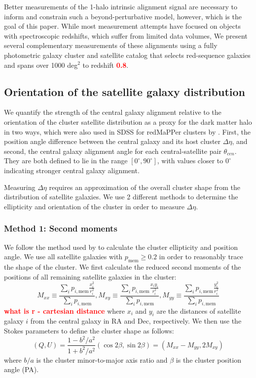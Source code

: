 \documentclass[fleqn,usenatbib]{mnras}
\newcommand{\verify}[1]{\textcolor{red}{\textbf{{#1}}}}
\newcommand{\degree}{^{\circ}}
\begin{document}
Better measurements of the 1-halo intrinsic alignment signal are necessary to inform and constrain such a beyond-perturbative model, however, which is the goal of this paper. While most measurement attempts have focused on objects with spectroscopic redshifts, which suffer from limited data volumes, We present several complementary measurements of these alignments using a fully photometric galaxy cluster and satellite catalog that selects red-sequence galaxies and spans over 1000 deg$^2$ to redshift \verify{0.8}.

\subsection{Orientation of the satellite galaxy distribution}\label{pamethod}

We quantify the strength of the central galaxy alignment relative to the orientation of the cluster satellite distribution as a proxy for the dark matter halo in two ways, which were also used in SDSS for redMaPPer clusters by \cite{Huang_2016}. First, the position angle difference between the central galaxy and its host cluster $\Delta \eta$, and second, the central galaxy alignment angle for each central-satellite pair $\theta _{cen}$. They are both defined to lie in the range $[0 \degree , 90 \degree]$, with values closer to $0 \degree$ indicating stronger central galaxy alignment.

Measuring $\Delta \eta$ requires an approximation of the overall cluster shape from the distribution of satellite galaxies. We use 2 different methods to determine the ellipticity and orientation of the cluster in order to measure $\Delta \eta$.

\subsubsection{Method 1: Second moments}

We follow the method used by \citet{Huang_2016} to calculate the cluster ellipticity and position angle. We use all satellite galaxies with $p_{\mathrm{mem}} \geq 0.2$ in order to reasonably trace the shape of the cluster. We first calculate the reduced second moments of the positions of all remaining satellite galaxies in the cluster:
\begin{equation}
    M_{xx} \equiv \frac{\sum_i p_{i,\mathrm{mem}} \frac{x_i^2}{r_i^2}}{\sum_i p_{i,\mathrm{mem}}}, M_{xy} \equiv \frac{\sum_i p_{i,\mathrm{mem}} \frac{x_i y_i}{r_i^2}}{\sum_i p_{i,\mathrm{mem}}}, M_{yy} \equiv \frac{\sum_i p_{i,\mathrm{mem}} \frac{y_i^2}{r_i^2}}{\sum_i p_{i,\mathrm{mem}}}
\end{equation}
\verify{what is r - cartesian distance}
where $x_i$ and $y_i$ are the distances of satellite galaxy $i$ from the central galaxy in RA and Dec, respectively. We then use the Stokes parameters to define the cluster shape as follows:
\begin{equation}
    (Q, U) = \frac{1-b^2/a^2}{1+b^2/a^2} (\cos 2\beta, \sin 2\beta) = (M_{xx} - M_{yy}, 2M_{xy})
\end{equation}
where $b/a$ is the cluster minor-to-major axis ratio and $\beta$ is the cluster position angle (PA).
\end{document}
